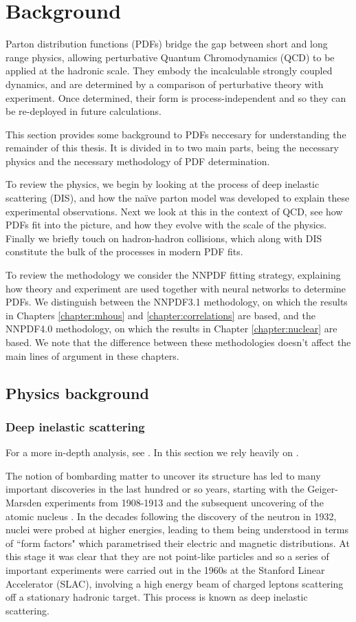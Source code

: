 \chapter{Background}
\label{chapter:background}
Parton distribution functions (PDFs) bridge the gap between short and long range physics, allowing perturbative Quantum Chromodynamics (QCD) to be applied at the hadronic scale. They embody the incalculable strongly coupled dynamics, and are determined by a comparison of perturbative theory with experiment. Once determined, their form is process-independent and so they can be re-deployed in future calculations. 

This section provides some background to PDFs neccesary for understanding the remainder of this thesis. It is divided in to two main parts, being the necessary physics and the necessary methodology of PDF determination.

To review the physics, we begin by looking at the process of deep inelastic scattering (DIS), and how the na\"ive parton model was developed to explain these experimental observations. Next we look at this in the context of QCD, see how PDFs fit into the picture, and how they evolve with the scale of the physics. Finally we briefly touch on hadron-hadron collisions, which along with DIS constitute the bulk of the processes in modern PDF fits.

To review the methodology we consider the NNPDF fitting strategy, explaining how theory and experiment are used together with neural networks to determine PDFs. We distinguish between the NNPDF3.1 methodology, on which the results in Chapters \ref{chapter:mhous} and \ref{chapter:correlations} are based, and the NNPDF4.0 methodology, on which the results in Chapter \ref{chapter:nuclear} are based. We note that the difference between these methodologies doesn't affect the main lines of argument in these chapters.

\section{Physics background}
\subsection{Deep inelastic scattering}
For a more in-depth analysis, see \cite{pinkbook, hm}. In this section we rely heavily on \cite{nikhefnotes, Hartland:2014nha}.

The notion of bombarding matter to uncover its structure has led to many important discoveries in the last hundred or so years, starting with the Geiger-Marsden experiments from 1908-1913 and the subsequent uncovering of the atomic nucleus \cite{nucleus}. In the decades following the discovery of the neutron in 1932, nuclei were probed at higher energies, leading to them being understood in terms of ``form factors" which parametrised their electric and magnetic distributions. At this stage it was clear that they are not point-like particles and so a series of important experiments were carried out in the 1960s at the Stanford Linear Accelerator (SLAC), involving a high energy beam of charged leptons scattering off a stationary hadronic target. This process is known as deep inelastic scattering. 

